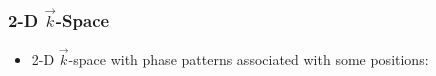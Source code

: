 %
%
%
%
%
%
%
%
%
%
%

\begin{frame}
	\frametitle{2-D $\vec k$-Space}

	\begin{itemize}
		\item 2-D $\vec k$-space with phase patterns associated with some positions:
	\end{itemize}

	\vspace{-2ex}

	\begin{center}
		
	\end{center}
\end{frame}

